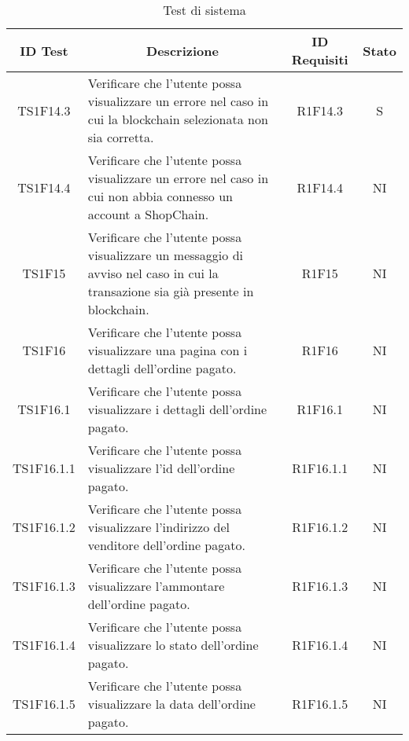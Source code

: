 \begin{table}[H]
  \centering
  \renewcommand{\arraystretch}{1.8}
  \begin{tabular}{c|p{8cm}|c|c}
    \rowcolor[HTML]{125E28}
    \color[HTML]{FFFFFF}\textbf{ID Test}
               & \multicolumn{1}{c}{\color[HTML]{FFFFFF}\textbf{Descrizione}}
               & \color[HTML]{FFFFFF}\textbf{ID Requisiti}
               & \color[HTML]{FFFFFF}\textbf{Stato}                                                                                                                      \\
    \hline
    TS1F14.3   & Verificare che l'utente possa visualizzare un errore nel caso in cui la blockchain\glo{} selezionata non sia corretta.                 & R1F14.3   & S \\
    TS1F14.4   & Verificare che l'utente possa visualizzare un errore nel caso in cui non abbia connesso un account a ShopChain.                        & R1F14.4   & NI \\
    TS1F15     & Verificare che l'utente possa visualizzare un messaggio di avviso nel caso in cui la transazione sia già presente in blockchain\glo{}. & R1F15     & NI \\
    TS1F16     & Verificare che l'utente possa visualizzare una pagina con i dettagli dell'ordine pagato.                                               & R1F16     & NI \\
    TS1F16.1   & Verificare che l'utente possa visualizzare i dettagli dell'ordine pagato.                                                              & R1F16.1   & NI \\
    TS1F16.1.1 & Verificare che l'utente possa visualizzare l'id dell'ordine pagato.                                                                    & R1F16.1.1 & NI \\
    TS1F16.1.2 & Verificare che l'utente possa visualizzare l'indirizzo del venditore dell'ordine pagato.                                               & R1F16.1.2 & NI \\
    TS1F16.1.3 & Verificare che l'utente possa visualizzare l'ammontare dell'ordine pagato.                                                             & R1F16.1.3 & NI \\
    TS1F16.1.4 & Verificare che l'utente possa visualizzare lo stato dell'ordine pagato.                                                                & R1F16.1.4 & NI \\
    TS1F16.1.5 & Verificare che l'utente possa visualizzare la data dell'ordine pagato.                                                                 & R1F16.1.5 & NI \\
  \end{tabular}
  \caption{Test di sistema}
\end{table}

